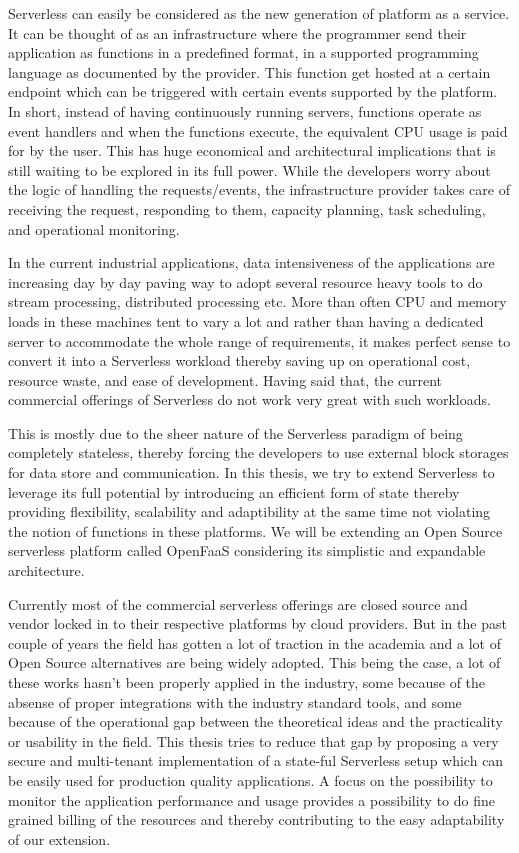 \documentclass[12pt,titlepage]{article}
\begin{document}
Serverless can easily be considered as the new generation of platform as a
service. It can be thought of as an infrastructure where the programmer send
their application as functions in a predefined format, in a supported
programming language as documented by the provider. This function get hosted at
a certain endpoint which can be triggered with certain events supported by the
platform. In short, instead of having continuously running servers, functions operate as
event handlers and when the functions execute, the equivalent CPU usage is paid
for by the user. This has huge economical and architectural implications that is
still waiting to be explored in its full power. While the developers worry about
the logic of handling the requests/events, the infrastructure provider takes
care of receiving the request, responding to them, capacity planning, task
scheduling, and operational monitoring\cite{gotoconf}.

In the current industrial applications, data intensiveness of the applications are increasing
day by day paving way to adopt several resource heavy tools to do stream
processing, distributed processing etc. More than often CPU and memory loads in
these machines tent to vary a lot and rather than having a dedicated server to accommodate the whole range
of requirements, it makes perfect sense to convert it into a Serverless workload
thereby saving up on operational cost, resource waste, and ease of development.
Having said that, the current commercial offerings of Serverless do not work
very great with such workloads.

This is mostly due to the sheer
nature of the Serverless paradigm of being completely stateless, thereby forcing
the developers to use external block storages for data store and communication.
In this thesis, we try to extend Serverless to leverage its full potential by
introducing an efficient form of state thereby providing flexibility, scalability and
adaptibility at the same time not violating the notion of functions in these platforms.
We will be extending an Open Source serverless platform called OpenFaaS
considering its simplistic and expandable architecture.

Currently most of the commercial serverless offerings are closed source
and vendor locked in to their respective platforms by cloud providers. But in the
past couple of years the field has gotten a lot of traction in the academia and
a lot of Open Source alternatives are being widely adopted. This being the case, a lot
of these works hasn't been properly applied in the industry, some because of
the absense of proper integrations with the industry standard tools, and some
because of the operational gap between the theoretical ideas and the
practicality or usability in the field. This thesis tries to reduce that
gap by proposing a very secure and multi-tenant implementation of a
state-ful Serverless setup which can be easily used for production quality
applications. A focus on the possibility to monitor the application performance
and usage provides a possibility to do fine grained billing of the resources and thereby
contributing to the easy adaptability of our extension.
\end{document}
